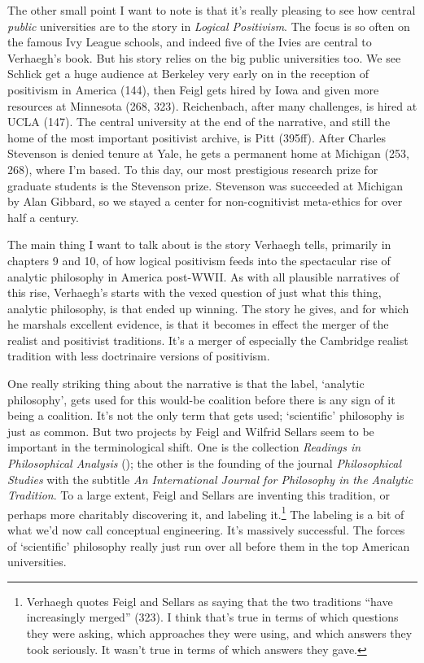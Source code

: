 \documentclass[
  11pt,
  letterpaper,
  DIV=11,
  numbers=noendperiod,
  twoside]{scrartcl}
\begin{document}
The other small point I want to note is that it's really pleasing to see
how central \emph{public} universities are to the story in \emph{Logical
Positivism}. The focus is so often on the famous Ivy League schools, and
indeed five of the Ivies are central to Verhaegh's book. But his story
relies on the big public universities too. We see Schlick get a huge
audience at Berkeley very early on in the reception of positivism in
America (144), then Feigl gets hired by Iowa and given more resources at
Minnesota (268, 323). Reichenbach, after many challenges, is hired at
UCLA (147). The central university at the end of the narrative, and
still the home of the most important positivist archive, is Pitt
(395ff). After Charles Stevenson is denied tenure at Yale, he gets a
permanent home at Michigan (253, 268), where I'm based. To this day, our
most prestigious research prize for graduate students is the Stevenson
prize. Stevenson was succeeded at Michigan by Alan Gibbard, so we stayed
a center for non-cognitivist meta-ethics for over half a century.

The main thing I want to talk about is the story Verhaegh tells,
primarily in chapters 9 and 10, of how logical positivism feeds into the
spectacular rise of analytic philosophy in America post-WWII. As with
all plausible narratives of this rise, Verhaegh's starts with the vexed
question of just what this thing, analytic philosophy, is that ended up
winning. The story he gives, and for which he marshals excellent
evidence, is that it becomes in effect the merger of the realist and
positivist traditions. It's a merger of especially the Cambridge realist
tradition with less doctrinaire versions of positivism.

One really striking thing about the narrative is that the label,
`analytic philosophy', gets used for this would-be coalition before
there is any sign of it being a coalition. It's not the only term that
gets used; `scientific' philosophy is just as common. But two projects
by Feigl and Wilfrid Sellars seem to be important in the terminological
shift. One is the collection \emph{Readings in Philosophical Analysis}
(); the other is
the founding of the journal \emph{Philosophical Studies} with the
subtitle \emph{An International Journal for Philosophy in the Analytic
Tradition}. To a large extent, Feigl and Sellars are inventing this
tradition, or perhaps more charitably discovering it, and labeling
it.\footnote{Verhaegh quotes Feigl and Sellars as saying that the two
  traditions ``have increasingly merged'' (323). I think that's true in
  terms of which questions they were asking, which approaches they were
  using, and which answers they took seriously. It wasn't true in terms
  of which answers they gave.} The labeling is a bit of what we'd now
call conceptual engineering. It's massively successful. The forces of
`scientific' philosophy really just run over all before them in the top
American universities.
\end{document}
